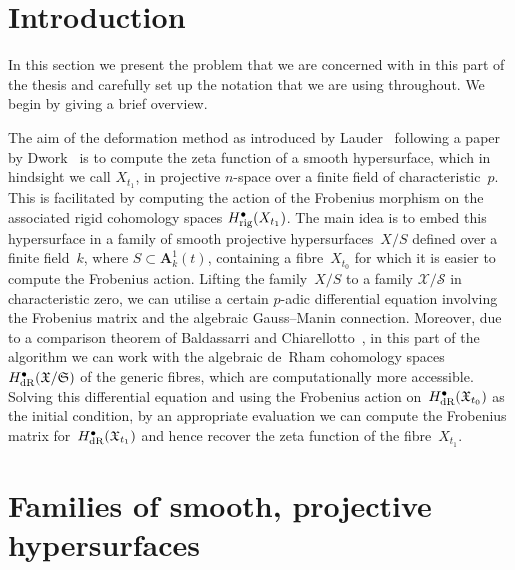 

\section{Introduction}

In this section we present the problem that we are concerned 
with in this part of the thesis and carefully set up the notation 
that we are using throughout.  We begin by giving a brief overview.

The aim of the deformation method as introduced by 
Lauder~\citep{Lau04} following a paper by Dwork~\citep{Dwork62b} 
is to compute the zeta function of a smooth 
hypersurface, which in hindsight we call $X_{t_1}$, in projective 
$n$-space over a finite field of characteristic~$p$.  This is 
facilitated by computing 
the action of the Frobenius morphism on the associated rigid cohomology 
spaces $H_{\text{rig}}^{\bullet}(X_{t_1})$.  The main idea is to embed this 
hypersurface in a family of smooth projective hypersurfaces~$X/S$ 
defined over a finite field~$k$, where $S \subset \mathbf{A}_k^1(t)$, 
containing a fibre~$X_{t_0}$ for which it is easier to compute the Frobenius 
action. Lifting the family~$X/S$ to a family $\mathcal{X}/\mathcal{S}$ in 
characteristic zero, we can utilise a certain $p$-adic differential 
equation involving the Frobenius matrix and the algebraic Gauss--Manin 
connection.  Moreover, due to a comparison theorem of Baldassarri and 
Chiarellotto~\citep{BalChi94}, in this 
part of the algorithm we can work with the algebraic de~Rham cohomology 
spaces~$H_{\text{dR}}^{\bullet}(\mathfrak{X}/\mathfrak{S})$ of the generic 
fibres, which are computationally more accessible.  Solving this differential 
equation and using the Frobenius action 
on~$H_{\text{dR}}^{\bullet}(\mathfrak{X}_{t_0})$ as the initial 
condition, by an appropriate evaluation we can compute the Frobenius matrix 
for~$H_{\text{dR}}^{\bullet}(\mathfrak{X}_{t_1})$ and hence recover the 
zeta function of the fibre~$X_{t_1}$.


\section{Families of smooth, projective hypersurfaces}

